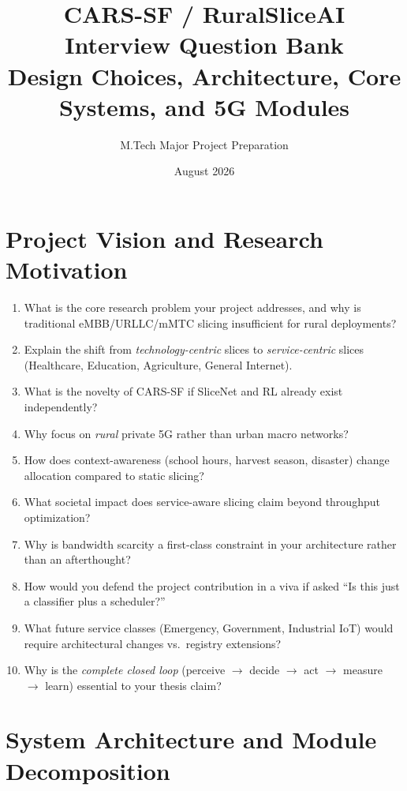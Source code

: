 \documentclass[11pt,a4paper]{article}
\title{
    \textbf{CARS-SF / RuralSliceAI}\\
    \large Interview Question Bank\\
    \normalsize Design Choices, Architecture, Core Systems, and 5G Modules
}
\author{M.Tech Major Project Preparation}
\date{August 2026}
\begin{document}
\maketitle
\tableofcontents
\newpage

\section{Project Vision and Research Motivation}

\begin{enumerate}
    \item What is the core research problem your project addresses, and why is traditional eMBB/URLLC/mMTC slicing insufficient for rural deployments?
    \item Explain the shift from \emph{technology-centric} slices to \emph{service-centric} slices (Healthcare, Education, Agriculture, General Internet).
    \item What is the novelty of CARS-SF if SliceNet and RL already exist independently?
    \item Why focus on \emph{rural} private 5G rather than urban macro networks?
    \item How does context-awareness (school hours, harvest season, disaster) change allocation compared to static slicing?
    \item What societal impact does service-aware slicing claim beyond throughput optimization?
    \item Why is bandwidth scarcity a first-class constraint in your architecture rather than an afterthought?
    \item How would you defend the project contribution in a viva if asked ``Is this just a classifier plus a scheduler?''
    \item What future service classes (Emergency, Government, Industrial IoT) would require architectural changes vs.\ registry extensions?
    \item Why is the \emph{complete closed loop} (perceive $\rightarrow$ decide $\rightarrow$ act $\rightarrow$ measure $\rightarrow$ learn) essential to your thesis claim?
\end{enumerate}

\section{System Architecture and Module Decomposition}
\end{document}
